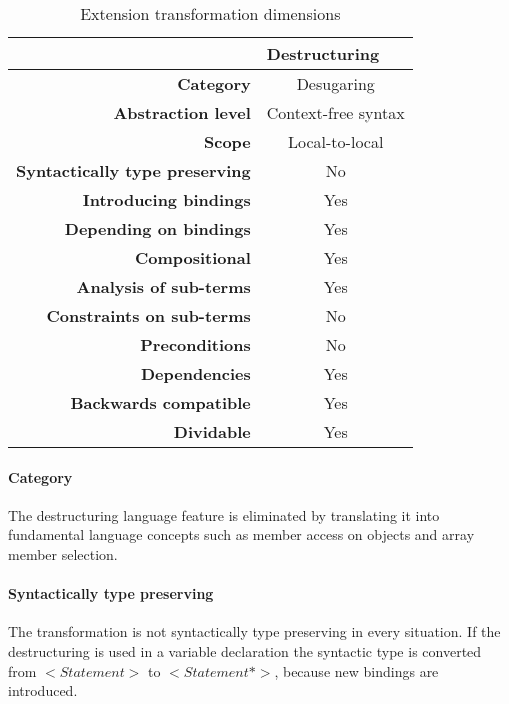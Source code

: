 \begin{table}[h]
\centering
\caption{Extension transformation dimensions}
\label{destructuring-table}
\begin{tabular}{@{}rc@{}}
\toprule
                                       & \multicolumn{1}{l}{\textbf{Destructuring}} \\ \midrule
\textbf{Category}                      & Desugaring
\\
\textbf{Abstraction level}          & Context-free syntax                          \\
\textbf{Scope}                         & Local-to-local                               \\
\textbf{Syntactically type preserving} & No                                          \\
\textbf{Introducing bindings}          & Yes                                          \\%
\textbf{Depending on bindings}         & Yes                                           \\
\textbf{Compositional}                 & Yes                                          \\
\textbf{Analysis of sub-terms}          & Yes                                          \\
\textbf{Constraints on sub-terms}       & No                                           \\
\textbf{Preconditions}                 & No                                          \\
\textbf{Dependencies}                  & Yes                                           \\
\textbf{Backwards compatible}          & Yes                                          \\
\textbf{Dividable}                     & Yes                                           \\ \bottomrule
\end{tabular}
\end{table}

\paragraph{Category}
The destructuring language feature is eliminated by translating it into fundamental language concepts such as member access on objects and array member selection.

\paragraph{Syntactically type preserving}
The transformation is not syntactically type preserving in every situation. If the destructuring is used in a variable declaration the syntactic type is converted from $<Statement>$ to $<Statement*>$, because new bindings are introduced.

